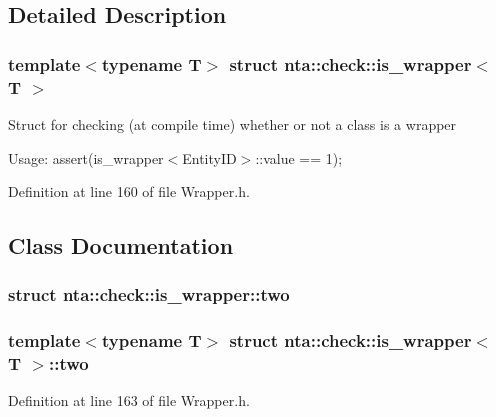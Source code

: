 \subsection{Detailed Description}
\subsubsection*{template$<$typename T$>$\newline
struct nta\+::check\+::is\+\_\+wrapper$<$ T $>$}

Struct for checking (at compile time) whether or not a class is a wrapper

Usage\+: assert(is\+\_\+wrapper$<$\+Entity\+I\+D$>$\+::value == 1); 

Definition at line 160 of file Wrapper.\+h.



\subsection{Class Documentation}
\label{structnta_1_1check_1_1is__wrapper_1_1two}
\subsubsection{struct nta\+:\+:check\+:\+:is\+\_\+wrapper\+:\+:two}
\subsubsection*{template$<$typename T$>$\newline
struct nta\+::check\+::is\+\_\+wrapper$<$ T $>$\+::two}



Definition at line 163 of file Wrapper.\+h.



